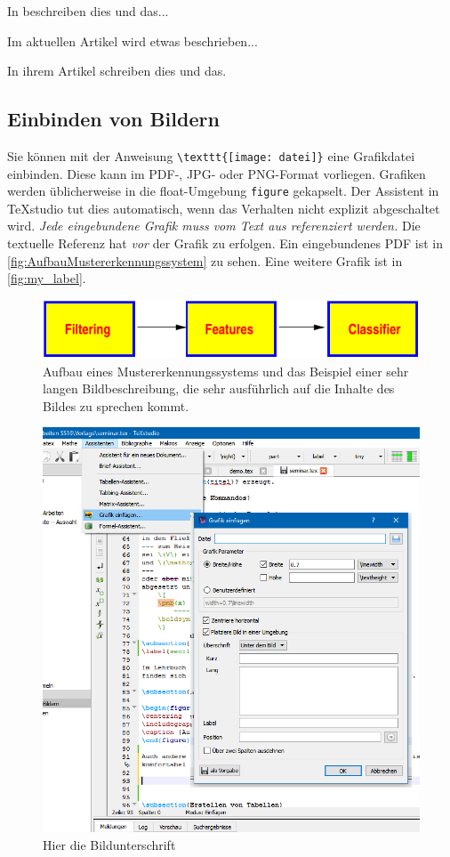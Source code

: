 In \autocite{Mamache2022} beschreiben \citeauthor{Mamache2022} dies und das...

Im aktuellen Artikel \autocite{Schaible2023} wird etwas beschrieben...

In ihrem Artikel \autocite[S. 18]{Oechsner2015} schreiben \citeauthor{Oechsner2015} dies und das.


\subsection{Einbinden von Bildern}

Sie können mit der Anweisung \lstinline|\texttt{[image: datei]}| eine Grafikdatei einbinden. Diese kann im PDF-, JPG- oder PNG-Format vorliegen. Grafiken werden üblicherweise in die float-Umgebung \lstinline|figure| gekapselt. Der Assistent in TeXstudio \autocite{vanderZander2018} tut dies automatisch, wenn das Verhalten nicht explizit abgeschaltet wird. \textit{Jede eingebundene Grafik muss vom Text aus referenziert werden.} Die textuelle Referenz hat \textit{vor} der Grafik zu erfolgen. Ein eingebundenes PDF ist in \autoref{fig:AufbauMustererkennungssystem} zu sehen. Eine weitere Grafik ist in \autoref{fig:my_label}.

\begin{figure}
\centering
\includegraphics [width=0.5\linewidth] {bilder/bildchen.pdf}
\caption [Aufbau eines Mustererkennungssystems]{Aufbau eines Mustererkennungssystems und das Beispiel einer sehr langen Bildbeschreibung, die sehr ausführlich auf die Inhalte des Bildes zu sprechen kommt. \autocite{Oechsner2015}}
\label{fig:AufbauMustererkennungssystem}
\end{figure}

\begin{figure}
    \centering
    \includegraphics[width=0.5\linewidth] {bilder/GrafikEinfuegen.png}
    \caption{Hier die Bildunterschrift}
    \label{fig:my_label}
\end{figure}

